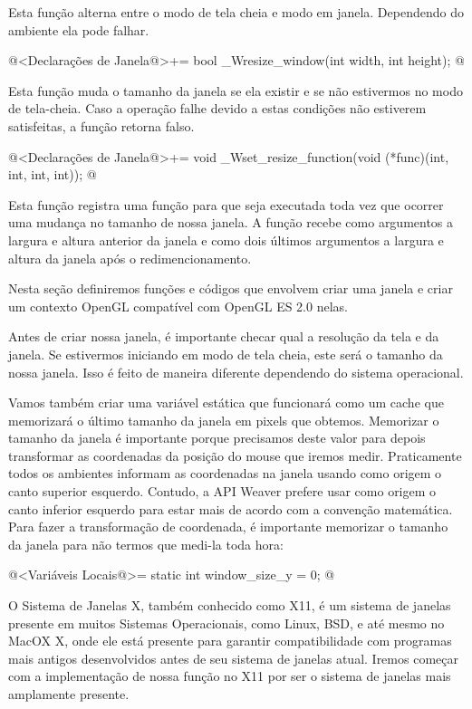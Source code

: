 Esta função alterna entre o modo de tela cheia e modo em
janela. Dependendo do ambiente ela pode falhar.

\iniciocodigo
@<Declarações de Janela@>+=
bool _Wresize_window(int width, int height);
@
\fimcodigo

Esta função muda o tamanho da janela se ela existir e se não
estivermos no modo de tela-cheia. Caso a operação falhe devido a estas
condições não estiverem satisfeitas, a função retorna falso.

\iniciocodigo
@<Declarações de Janela@>+=
void _Wset_resize_function(void (*func)(int, int, int, int));
@
\fimcodigo

Esta função registra uma função para que seja executada toda vez que
ocorrer uma mudança no tamanho de nossa janela. A função recebe como
argumentos a largura e altura anterior da janela e como dois últimos
argumentos a largura e altura da janela após o redimencionamento.


Nesta seção definiremos funções e códigos que envolvem criar uma
janela e criar um contexto OpenGL compatível com OpenGL ES 2.0 nelas.


Antes de criar nossa janela, é importante checar qual a resolução da
tela e da janela. Se estivermos iniciando em modo de tela cheia, este
será o tamanho da nossa janela. Isso é feito de maneira diferente
dependendo do sistema operacional.

Vamos também criar uma variável estática que funcionará como um cache
que memorizará o último tamanho da janela em pixels que
obtemos. Memorizar o tamanho da janela é importante porque precisamos
deste valor para depois transformar as coordenadas da posição do mouse
que iremos medir. Praticamente todos os ambientes informam as
coordenadas na janela usando como origem o canto superior
esquerdo. Contudo, a API Weaver prefere usar como origem o canto
inferior esquerdo para estar mais de acordo com a convenção
matemática. Para fazer a transformação de coordenada, é importante
memorizar o tamanho da janela para não termos que medi-la toda hora:

\iniciocodigo
@<Variáveis Locais@>=
static int window_size_y = 0;
@
\fimcodigo


O Sistema de Janelas X, também conhecido como X11, é um sistema de
janelas presente em muitos Sistemas Operacionais, como Linux, BSD, e
até mesmo no MacOX X, onde ele está presente para garantir
compatibilidade com programas mais antigos desenvolvidos antes de seu
sistema de janelas atual. Iremos começar com a implementação de nossa
função no X11 por ser o sistema de janelas mais amplamente presente.

